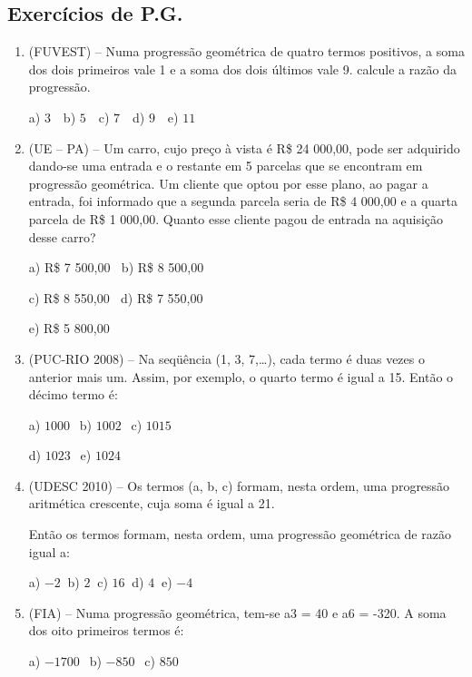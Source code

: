 \begin{multicols*}{2}
    \subsection{Exercícios de P.G.}

    \begin{enumerate}

        \item  (FUVEST) – Numa progressão geométrica de quatro termos positivos, a soma dos dois primeiros vale 1 e a soma dos dois últimos vale 9. calcule a razão da progressão.

              a) $3 \ \ \ $ b) $5 \ \ \ $ c) $7 \ \ \ $ d) $9 \ \ \ $ e) $11$

        \item (UE – PA) – Um carro, cujo preço à vista é R\$ 24 000,00, pode ser adquirido dando-se uma entrada e o restante em 5 parcelas que se encontram em progressão geométrica. Um cliente que optou por esse plano, ao pagar a entrada, foi informado que a segunda parcela seria de R\$ 4 000,00 e a quarta parcela de R\$ 1 000,00. Quanto esse cliente pagou de entrada na aquisição desse carro?

              a) R\$ 7 500,00 $ \ $ b) R\$ 8 500,00

              c) R\$ 8 550,00 $ \ $ d) R\$ 7 550,00

              e) R\$ 5 800,00

        \item  (PUC-RIO 2008) – Na seqüência (1, 3, 7,…), cada termo é duas vezes o anterior mais um. Assim, por exemplo, o quarto termo é igual a 15. Então o décimo termo é:

              a) $1000 \ \ $ b) $1002 \ \ $ c) $1015 \ \ $

              d) $1023 \ \ $ e) $1024 $

        \item (UDESC 2010) – Os termos (a, b, c) formam, nesta ordem, uma progressão aritmética crescente, cuja soma é igual a 21.

              Então os termos formam, nesta ordem, uma progressão geométrica de razão igual a:

              a) $-2 \ $ b) $2 \ $ c) $16 \ $ d) $4 \ $ e) $-4$

        \item (FIA) – Numa progressão geométrica, tem-se a3 = 40 e a6 = -320. A soma dos oito primeiros termos é:

              a) $-1700 \ \ $ b) $-850 \ \ $ c) $850 \ \ $


\end{enumerate}
\end{multicols*}
